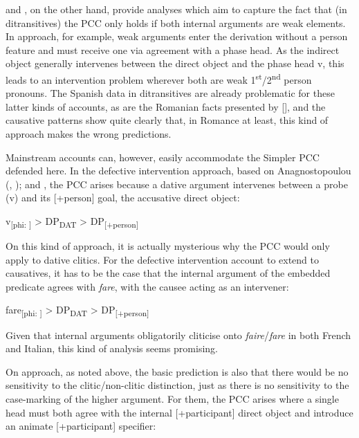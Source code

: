 \documentclass[output=paper,colorlinks,citecolor=brown,nonflat]{./langscibook}
\begin{document}
\citet{Bianchi2006} and \citet{Stegovec2017}, on the other hand, provide analyses which aim to capture the fact that (in ditransitives) the PCC only holds if both internal arguments are weak elements. In  approach, for example, weak arguments enter the derivation without a person feature and must receive one via agreement with a phase head. As the indirect object generally intervenes between the direct object and the phase head v, this leads to an intervention problem wherever both are weak 1\textsuperscript{st}/2\textsuperscript{nd} person pronouns. The Spanish data in ditransitives are already problematic for these latter kinds of accounts, as are the Romanian facts presented by  [], and the causative patterns show quite clearly that, in Romance at least, this kind of approach makes the wrong predictions. 

Mainstream accounts can, however, easily accommodate the Simpler PCC defended here. In the defective intervention approach, based on Anagnostopoulou (\citeyear{Anagnostopoulou2003}, \citeyear{Anagnostopoulou2005}); \citet{BéjarRezac2003} and \citet{Rezac2008}, the PCC arises because a dative argument intervenes between a probe (v) and its [+person] goal, the accusative direct object:

\ea%
    \label{ex:sheehan:37}
    v\textsubscript{[phi: ]}    > DP\textsubscript{DAT} >     DP\textsubscript{[+person]}
\z

On this kind of approach, it is actually mysterious why the PCC would only apply to dative clitics. For the defective intervention account to extend to causatives, it has to be the case that the internal argument of the embedded predicate agrees with \textit{fare}, with the causee acting as an intervener:

\ea%
    \label{ex:sheehan:38}
    fare\textsubscript{[phi: ]}   >  DP\textsubscript{DAT} >   DP\textsubscript{[+person]}
\z

Given that internal arguments obligatorily cliticise onto \textit{faire}/\textit{fare} in both French and Italian, this kind of analysis seems promising. 

On  approach, as noted above, the basic prediction is also that there would be no sensitivity to the clitic/non-clitic distinction, just as there is no sensitivity to the case-marking of the higher argument. For them, the PCC arises where a single head must both agree with the internal [+participant] direct object and introduce an animate [+participant] specifier:
\end{document}
